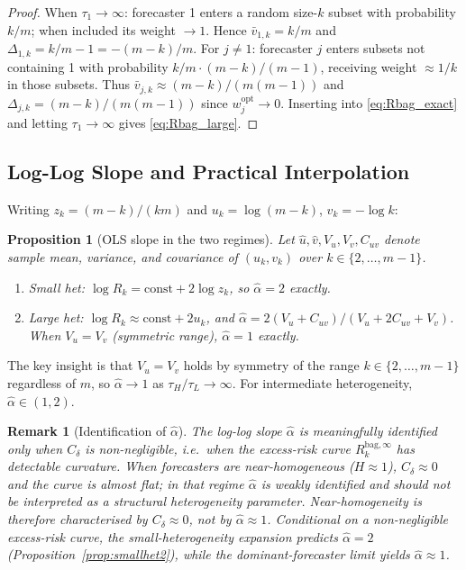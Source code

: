 \documentclass[12pt,a4paper]{article}
\newtheorem{proposition}{Proposition}
\newtheorem{remark}{Remark}
\theoremstyle{definition}
\begin{document}
\begin{proof}
When $\tau_1\to\infty$: forecaster 1 enters a random size-$k$ subset with
probability $k/m$; when included its weight $\to 1$.
Hence $\bar v_{1,k}=k/m$ and $\Delta_{1,k}=k/m-1=-(m-k)/m$.
For $j\neq 1$: forecaster $j$ enters subsets not containing 1 with probability
$k/m\cdot(m-k)/(m-1)$, receiving weight $\approx 1/k$ in those subsets.
Thus $\bar v_{j,k}\approx(m-k)/(m(m-1))$ and $\Delta_{j,k}=(m-k)/(m(m-1))$ since
$w_j^{\mathrm{opt}}\to 0$. Inserting into \eqref{eq:Rbag_exact}
and letting $\tau_1\to\infty$ gives \eqref{eq:Rbag_large}.
\end{proof}

\subsection{Log-Log Slope and Practical Interpolation}

Writing $z_k=(m-k)/(km)$ and $u_k=\log(m-k)$, $v_k=-\log k$:

\begin{proposition}[OLS slope in the two regimes]\label{prop:alpha}
Let $\hat u,\hat v,V_u,V_v,C_{uv}$ denote sample mean, variance, and
covariance of $(u_k,v_k)$ over $k\in\{2,\ldots,m-1\}$.
\begin{enumerate}[label=(\roman*)]
\item Small het: $\log R_k=\mathrm{const}+2\log z_k$, so $\hat\alpha=2$ exactly.
\item Large het: $\log R_k\approx\mathrm{const}+2u_k$, and
  $\hat\alpha=2(V_u+C_{uv})/(V_u+2C_{uv}+V_v)$.
  When $V_u=V_v$ (symmetric range), $\hat\alpha=1$ exactly.
\end{enumerate}
\end{proposition}

The key insight is that $V_u=V_v$ holds by symmetry of the range
$k\in\{2,\ldots,m-1\}$ regardless of $m$, so $\hat\alpha\to 1$ as
$\tau_H/\tau_L\to\infty$. For intermediate heterogeneity,
$\hat\alpha\in(1,2)$.

\begin{remark}[Identification of $\hat\alpha$]
The log-log slope $\hat\alpha$ is meaningfully identified only when
$C_\delta$ is non-negligible, i.e.\ when the excess-risk curve
$R_k^{\mathrm{bag},\infty}$ has detectable curvature. When forecasters
are near-homogeneous ($H\approx1$), $C_\delta\approx0$ and the curve
is almost flat; in that regime $\hat\alpha$ is weakly identified and
should not be interpreted as a structural heterogeneity parameter.
Near-homogeneity is therefore characterised by $C_\delta\approx0$, not
by $\hat\alpha\approx1$. Conditional on a non-negligible excess-risk
curve, the small-heterogeneity expansion predicts $\hat\alpha=2$
(Proposition~\ref{prop:smallhet2}), while the dominant-forecaster limit
yields $\hat\alpha\approx1$.
\end{remark}
\end{document}
